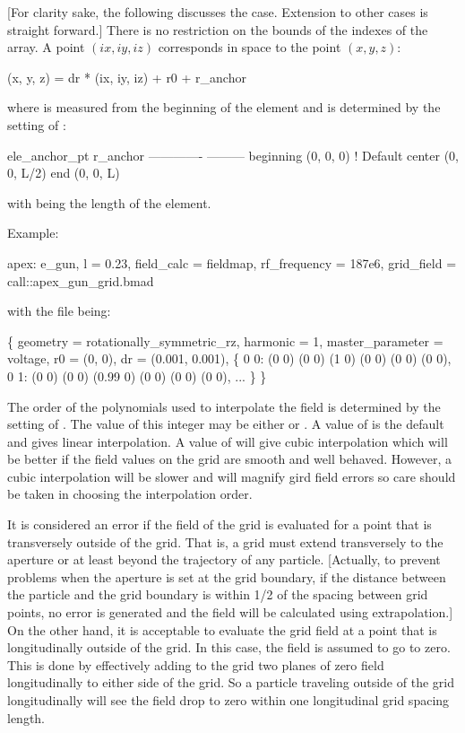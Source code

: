 [For clarity sake, the following discusses the  case. Extension to other cases is straight
forward.]  There is no restriction on the bounds of the indexes  of the  array. A point $(ix, iy, iz)$ corresponds in space to the point $(x, y, z)$:
\begin{example}
  (x, y, z) = dr * (ix, iy, iz) + r0 + r_anchor
\end{example}
where  is measured from the beginning of the element and
 is determined by the setting of :
\begin{example}
  ele_anchor_pt       r_anchor
  -------------       ---------
  beginning           (0, 0, 0)      ! Default
  center              (0, 0, L/2)
  end                 (0, 0, L)
\end{example}
with  being the length of the element. 

Example:
\begin{example}
  apex: e_gun, l = 0.23, field_calc = fieldmap, rf_frequency = 187e6, 
                                  grid_field = call::apex_gun_grid.bmad
\end{example}
with the file  being:
\begin{example}
  \{
    geometry = rotationally_symmetric_rz,
    harmonic = 1,
    master_parameter = voltage,
    r0 = (0, 0),
    dr = (0.001, 0.001),
    \{
      0 0:  (0 0) (0 0) (1 0)     (0 0) (0 0) (0 0),
      0 1:  (0 0) (0 0) (0.99 0)  (0 0) (0 0) (0 0),
      ... 
    \}
  \}
\end{example}

The order of the polynomials used to interpolate the field is determined by the setting of
. The value of this integer may be either  or . A value of
 is the default and gives linear interpolation.  A value of  will give cubic
interpolation which will be better if the field values on the grid are smooth and well behaved.
However, a cubic interpolation will be slower and will magnify gird field errors so care should be
taken in choosing the interpolation order.

It is considered an error if the field of the grid is evaluated for a point that is transversely
outside of the grid. That is, a grid must extend transversely to the aperture or at least beyond the
trajectory of any particle. [Actually, to prevent problems when the aperture is set at the grid
boundary, if the distance between the particle and the grid boundary is within 1/2 of the spacing
between grid points, no error is generated and the field will be calculated using extrapolation.] On
the other hand, it is acceptable to evaluate the grid field at a point that is longitudinally
outside of the grid. In this case, the field is assumed to go to zero. This is done by effectively
adding to the grid two planes of zero field longitudinally to either side of the grid. So a particle
traveling outside of the grid longitudinally will see the field drop to zero within one longitudinal
grid spacing length.

